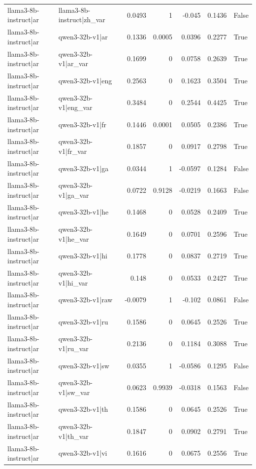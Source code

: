 \begin{table}
\begin{tabular}{l l r r r r l}
llama3-8b-instruct|ar & llama3-8b-instruct|zh_var & 0.0493 & 1 & -0.045 & 0.1436 & False \\
llama3-8b-instruct|ar & qwen3-32b-v1|ar & 0.1336 & 0.0005 & 0.0396 & 0.2277 & True \\
llama3-8b-instruct|ar & qwen3-32b-v1|ar_var & 0.1699 & 0 & 0.0758 & 0.2639 & True \\
llama3-8b-instruct|ar & qwen3-32b-v1|eng & 0.2563 & 0 & 0.1623 & 0.3504 & True \\
llama3-8b-instruct|ar & qwen3-32b-v1|eng_var & 0.3484 & 0 & 0.2544 & 0.4425 & True \\
llama3-8b-instruct|ar & qwen3-32b-v1|fr & 0.1446 & 0.0001 & 0.0505 & 0.2386 & True \\
llama3-8b-instruct|ar & qwen3-32b-v1|fr_var & 0.1857 & 0 & 0.0917 & 0.2798 & True \\
llama3-8b-instruct|ar & qwen3-32b-v1|ga & 0.0344 & 1 & -0.0597 & 0.1284 & False \\
llama3-8b-instruct|ar & qwen3-32b-v1|ga_var & 0.0722 & 0.9128 & -0.0219 & 0.1663 & False \\
llama3-8b-instruct|ar & qwen3-32b-v1|he & 0.1468 & 0 & 0.0528 & 0.2409 & True \\
llama3-8b-instruct|ar & qwen3-32b-v1|he_var & 0.1649 & 0 & 0.0701 & 0.2596 & True \\
llama3-8b-instruct|ar & qwen3-32b-v1|hi & 0.1778 & 0 & 0.0837 & 0.2719 & True \\
llama3-8b-instruct|ar & qwen3-32b-v1|hi_var & 0.148 & 0 & 0.0533 & 0.2427 & True \\
llama3-8b-instruct|ar & qwen3-32b-v1|raw & -0.0079 & 1 & -0.102 & 0.0861 & False \\
llama3-8b-instruct|ar & qwen3-32b-v1|ru & 0.1586 & 0 & 0.0645 & 0.2526 & True \\
llama3-8b-instruct|ar & qwen3-32b-v1|ru_var & 0.2136 & 0 & 0.1184 & 0.3088 & True \\
llama3-8b-instruct|ar & qwen3-32b-v1|sw & 0.0355 & 1 & -0.0586 & 0.1295 & False \\
llama3-8b-instruct|ar & qwen3-32b-v1|sw_var & 0.0623 & 0.9939 & -0.0318 & 0.1563 & False \\
llama3-8b-instruct|ar & qwen3-32b-v1|th & 0.1586 & 0 & 0.0645 & 0.2526 & True \\
llama3-8b-instruct|ar & qwen3-32b-v1|th_var & 0.1847 & 0 & 0.0902 & 0.2791 & True \\
llama3-8b-instruct|ar & qwen3-32b-v1|vi & 0.1616 & 0 & 0.0675 & 0.2556 & True \\

\end{tabular}
\end{table}
